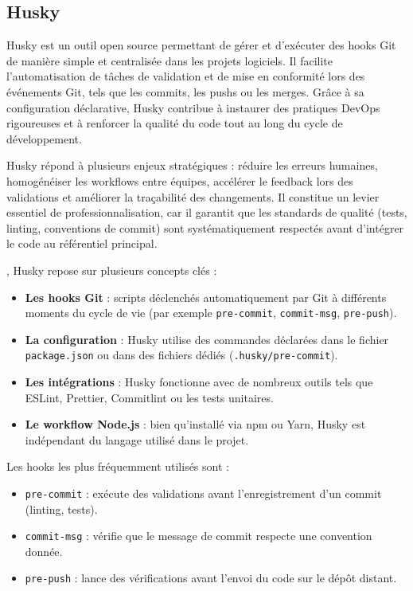 \subsection{Husky}

Husky est un outil open source permettant de gérer et d’exécuter des hooks Git de manière simple et centralisée dans les projets logiciels. Il facilite l’automatisation de tâches de validation et de mise en conformité lors des événements Git, tels que les commits, les pushs ou les merges. Grâce à sa configuration déclarative, Husky contribue à instaurer des pratiques DevOps rigoureuses et à renforcer la qualité du code tout au long du cycle de développement.

 Husky répond à plusieurs enjeux stratégiques  : réduire les erreurs humaines, homogénéiser les workflows entre équipes, accélérer le feedback lors des validations et améliorer la traçabilité des changements. Il constitue un levier essentiel de professionnalisation, car il garantit que les standards de qualité (tests, linting, conventions de commit) sont systématiquement respectés avant d’intégrer le code au référentiel principal.

, Husky repose sur plusieurs concepts clés  :
\begin{itemize}
	\item \textbf{Les hooks Git}  : scripts déclenchés automatiquement par Git à différents moments du cycle de vie (par exemple \texttt{pre-commit}, \texttt{commit-msg}, \texttt{pre-push}).
	\item \textbf{La configuration}  : Husky utilise des commandes déclarées dans le fichier \texttt{package.json} ou dans des fichiers dédiés (\texttt{.husky/pre-commit}).
	\item \textbf{Les intégrations}  : Husky fonctionne avec de nombreux outils tels que ESLint, Prettier, Commitlint ou les tests unitaires.
	\item \textbf{Le workflow Node.js}  : bien qu’installé via npm ou Yarn, Husky est indépendant du langage utilisé dans le projet.
\end{itemize}

Les hooks les plus fréquemment utilisés sont  :
\begin{itemize}
	\item \texttt{pre-commit}  : exécute des validations avant l’enregistrement d’un commit (linting, tests).
	\item \texttt{commit-msg}  : vérifie que le message de commit respecte une convention donnée.
	\item \texttt{pre-push}  : lance des vérifications avant l’envoi du code sur le dépôt distant.
\end{itemize}

